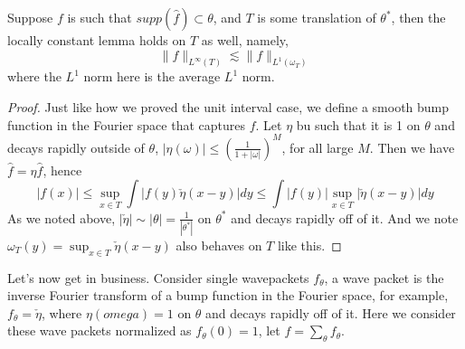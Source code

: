 \begin{lemma}
    Suppose $f$ is such that $supp(\widehat{f})\subset\theta$, and $T$ is some translation of $\theta^*$, then the locally constant lemma holds on $T$ as well, namely,
    \begin{equation*}
        \|f\|_{L^\infty(T)}\lesssim \|f\|_{L^1(\omega_T)}
    \end{equation*}
    where the $L^1$ norm here is the average $L^1$ norm.
\end{lemma}
\begin{proof}
    Just like how we proved the unit interval case, we define a smooth bump function in the Fourier space that captures $f$. Let $\eta$ bu such that it is 1 on $\theta$ and decays rapidly outside of $\theta$, $|\eta(\omega)|\leq\left(\frac{1}{1+|\omega|} \right)^M$, for all large $M$. Then we have $\widehat{f}=\eta\widehat{f}$, hence \begin{equation*}
        |f(x)|\leq\sup_{x\in T}\int|f(y)\check{\eta}(x-y)|dy\leq \int|f(y)|\sup_{x\in T}|\check{\eta}(x-y)|dy
    \end{equation*}
    As we noted above, $|\check{\eta}|\sim |\theta|=\frac{1}{|\theta^*|}$ on $\theta^*$ and decays rapidly off of it. And we note $\omega_T(y)=\sup_{x\in T}\check{\eta}(x-y)$ also behaves on $T$ like this.
\end{proof}

Let's now get in business. Consider single wavepackets $f_\theta$, a wave packet is the inverse Fourier transform of a bump function in the Fourier space, for example, $f_\theta=\check{\eta}$, where $\eta(omega)=1$ on $\theta$ and decays rapidly off of it. Here we consider these wave packets normalized as $f_\theta(0)=1$, let $f=\sum_\theta f_\theta$.


